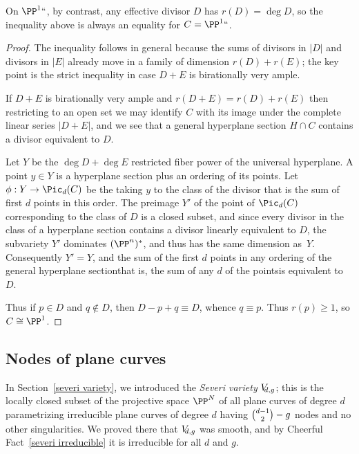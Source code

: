On $\PP^1` `$, by contrast, any effective divisor $D$ has $r(D) = \deg
D$, so the inequality above is
always an equality for $C = \PP^1` `$.

\begin{proof}
 The inequality follows in general because the sums of divisors in $|D|$
 and divisors in $|E|$ already move in
 a family of dimension $r(D)+r(E)$; the key point is the strict inequality
 in case $D+E$ is birationally very ample.

If $D+E$ is birationally very ample and $r(D+E) = r(D)+r(E)$ then
restricting to an open set
we may identify $C$ with its image under the complete linear series
$|D+E|$, and we see that a general hyperplane section $H\cap C$ contains
a divisor equivalent to $D$.

Let $Y$ be the $\deg D +\deg E$ restricted fiber power of the universal
hyperplane.
A point $y\in Y$ is a hyperplane section plus an ordering of its points.
Let $\phi: Y \to \Pic_d(C)$ be the 
%
 taking $y$
 to the class of the divisor that is the sum of first $d$ points in this
 order. The preimage  $Y'$ of the point of $\Pic_d(C)$ corresponding to
 the class of $D$ is a closed subset, and
since every divisor in the class of a hyperplane section contains
a divisor
linearly equivalent to  $D$, the subvariety $Y'$ dominates $(\PP^{n})^*$,
and thus
has the same dimension as~$Y$. Consequently $Y'=Y$, and the sum of the
first $d$ points
in any ordering of the general hyperplane section\emdash that is, the
sum of any $d$
of the points\emdash is equivalent to $D$.

Thus if $p\in D$ and $q\notin D$, then $D-p+q \equiv D$, whence $q\equiv
p$. Thus
$r(p)\geq 1$, so $C\cong \PP^1$.
\end{proof}

\subsection*{Nodes of plane curves}

\def\VD#1{V_{\mskip-5mu d,#1}} %

In Section~\ref{severi variety}, we introduced the \emph{Severi variety}
%
$\VD{g}$; this is the locally closed subset of the projective space
$\PP^N$ of all plane curves of degree $d$ parametrizing irreducible
plane curves of degree $d$ having 
$\tbinom{d-1}{2} - \nobreak g$ 
nodes and no other singularities. We proved there that $\VD{g}$ was
smooth, and by Cheerful Fact~\ref{severi irreducible} it is irreducible
for all $d$ and $g$.

